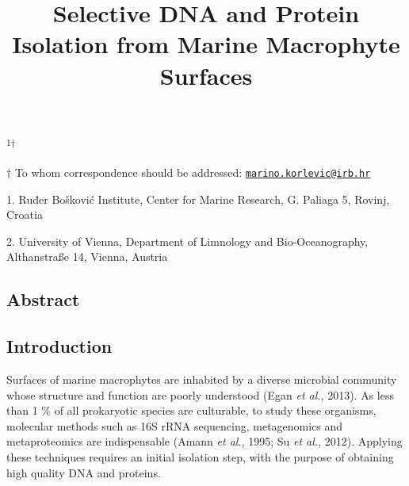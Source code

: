 \documentclass[12pt,]{article}
\title{\textbf{Selective DNA and Protein Isolation from Marine Macrophyte
Surfaces}}
\author{}
\date{}
\begin{document}
\maketitle

\vspace{80mm}

\textsuperscript{1\(\dagger\)}

\vspace{40mm}

\(\dagger\) To whom correspondence should be addressed:
\href{mailto:marino.korlevic@irb.hr}{\nolinkurl{marino.korlevic@irb.hr}}

1. Ruđer Bošković Institute, Center for Marine Research, G. Paliaga 5,
Rovinj, Croatia

2. University of Vienna, Department of Limnology and Bio-Oceanography,
Althanstraße 14, Vienna, Austria \newpage
\linenumbers
{} \setlength\parindent{24pt}

\subsection{Abstract}\label{abstract}

\newpage

\subsection{Introduction}\label{introduction}

Surfaces of marine macrophytes are inhabited by a diverse microbial
community whose structure and function are poorly understood (Egan
\emph{et al.}, 2013). As less than 1 \% of all prokaryotic species are
culturable, to study these organisms, molecular methods such as 16S rRNA
sequencing, metagenomics and metaproteomics are indispensable (Amann
\emph{et al.}, 1995; Su \emph{et al.}, 2012). Applying these techniques
requires an initial isolation step, with the purpose of obtaining high
quality DNA and proteins.
\end{document}
